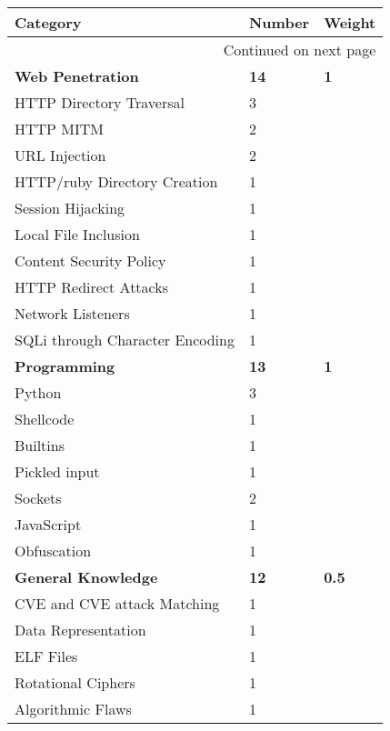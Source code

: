 \documentclass[a4paper,11pt]{report}
\begin{document}
			\begin{center}
				\begin{longtable}{| l | l | l |}
					\hline
					\textbf{Category} & \textbf{Number} & \textbf{Weight} \\ \hline 
					\endhead
					\multicolumn{3}{|r|}{{Continued on next page}} \\ \hline
					\endfoot
					\endlastfoot
					\textbf{Web Penetration} & \textbf{14} & \textbf{1} \\ \hline
					\quad HTTP Directory Traversal & 3 & \\ \hline
					\quad HTTP MITM & 2 & \\ \hline
					\quad URL Injection & 2 & \\ \hline
					\quad HTTP/ruby Directory Creation & 1 & \\ \hline 
					\quad Session Hijacking & 1 & \\ \hline
					\quad Local File Inclusion & 1 & \\ \hline 
					\quad Content Security Policy & 1 & \\ \hline 
					\quad HTTP Redirect Attacks & 1 & \\ \hline 
					\quad Network Listeners & 1 & \\ \hline 
					\quad SQLi through Character Encoding & 1 & \\ \hline 
					\textbf{Programming} & \textbf{13} & \textbf{1} \\ \hline
					\quad Python & 3 & \\ \hline 
						\qquad Shellcode & 1 & \\ \hline 
						\qquad Builtins & 1 & \\ \hline 
						\qquad Pickled input & 1 & \\ \hline 
					\quad Sockets & 2 & \\ \hline 
					\quad JavaScript & 1 & \\ \hline 
					\quad Obfuscation & 1 & \\ \hline
					\textbf{General Knowledge} & \textbf{12} & \textbf{0.5}\\ \hline 
					\quad CVE and CVE attack Matching & 1 & \\ \hline 
					\quad Data Representation & 1 & \\ \hline
					\quad ELF Files & 1 & \\ \hline
					\quad Rotational Ciphers & 1 & \\ \hline
					\quad Algorithmic Flaws & 1 & \\ \hline 

\end{longtable}
\end{center}
\end{document}

